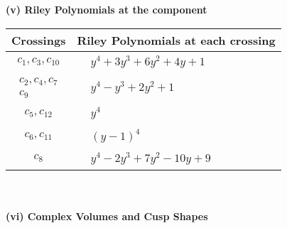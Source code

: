 \documentclass[1p]{elsarticle_modified}
\theoremstyle{definition}
\begin{document}
\newpage\renewcommand{\arraystretch}{1}
\flushleft \textbf{(v) Riley Polynomials at the component}\newline \\
\begin{tabular}{m{50pt}|m{274pt}}
Crossings & \hspace{64pt}Riley Polynomials at each crossing \\
\hline $$\begin{aligned}c_{1},c_{3},c_{10}\end{aligned}$$&$\begin{aligned}
&y^4+3 y^3+6 y^2+4 y+1
\end{aligned}$\\
\hline $$\begin{aligned}c_{2},c_{4},c_{7}\\c_{9}\end{aligned}$$&$\begin{aligned}
&y^4- y^3+2 y^2+1
\end{aligned}$\\
\hline $$\begin{aligned}c_{5},c_{12}\end{aligned}$$&$\begin{aligned}
&y^4
\end{aligned}$\\
\hline $$\begin{aligned}c_{6},c_{11}\end{aligned}$$&$\begin{aligned}
&(y-1)^4
\end{aligned}$\\
\hline $$\begin{aligned}c_{8}\end{aligned}$$&$\begin{aligned}
&y^4-2 y^3+7 y^2-10 y+9
\end{aligned}$\\
\hline
\end{tabular}\\~\\
\newpage\flushleft \textbf{(vi) Complex Volumes and Cusp Shapes}
\end{document}
